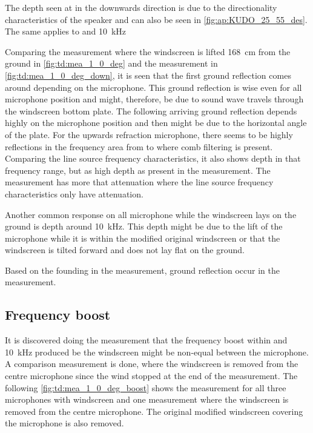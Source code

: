 The depth seen at  in the downwards direction is due to the directionality characteristics of the speaker and can also be seen in \autoref{fig:ap:KUDO_25_55_des}. The same applies to  and \SI{10}{\kilo\hertz}

Comparing the measurement where the windscreen is lifted \SI{168}{\centi\meter} from the ground in \autoref{fig:td:mea_1_0_deg} and the measurement in \autoref{fig:td:mea_1_0_deg_down}, it is seen that the first ground reflection comes around  depending on the microphone. This ground reflection is \db wise even for all microphone position and might, therefore, be due to sound wave travels through the windscreen bottom plate. The following arriving ground reflection depends highly on the microphone position and then might be due to the horizontal angle of the plate. For the upwards refraction microphone, there seems to be highly reflections in the frequency area from  to  where comb filtering is present. Comparing the line source frequency characteristics, it also shows depth in that frequency range, but as high depth as present in the measurement. The measurement has more that  attenuation where the line source frequency characteristics only have  attenuation.

Another common response on all microphone while the windscreen lays on the ground is depth around \SI{10}{\kilo\hertz}. This depth might be due to the lift of the microphone while it is within the modified original windscreen or that the windscreen is tilted forward and does not lay flat on the ground. 

Based on the founding in the measurement, ground reflection occur in the measurement.


\subsection{Frequency boost}\label{sec:des:freq_boost}
It is discovered doing the measurement that the frequency boost within  and \SI{10}{\kilo\hertz} produced be the windscreen might be non-equal between the microphone. A comparison measurement is done, where the windscreen is removed from the centre microphone since the wind stopped at the end of the measurement. The following \autoref{fig:td:mea_1_0_deg_boost} shows the measurement for all three microphones with windscreen and one measurement where the windscreen is removed from the centre microphone. The original modified windscreen covering the microphone is also removed. 

